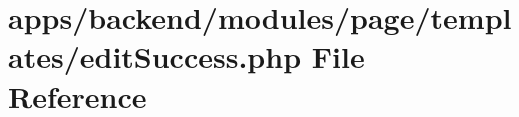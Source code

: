 \hypertarget{backend_2modules_2page_2templates_2edit_success_8php}{\section{apps/backend/modules/page/templates/edit\-Success.php File Reference}
\label{backend_2modules_2page_2templates_2edit_success_8php}
}
